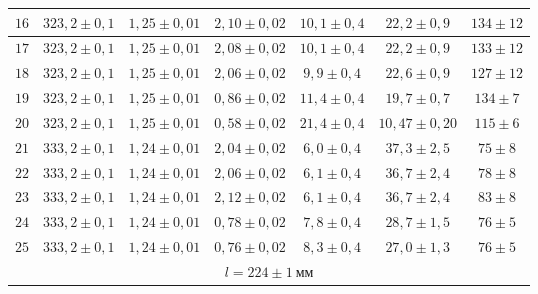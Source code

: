 \begin{tabular}{|c|c|c|c|c|c|c|}
  $16$ & $323,2 \pm 0,1$ & $1,25 \pm 0,01$ & $2,10 \pm 0,02$ & $10,1 \pm 0,4$ & $22,2 \pm 0,9$ & $134 \pm 12$\\ \hline
  $17$ & $323,2 \pm 0,1$ & $1,25 \pm 0,01$ & $2,08 \pm 0,02$ & $10,1 \pm 0,4$ & $22,2 \pm 0,9$ & $133 \pm 12$\\ \hline
  $18$ & $323,2 \pm 0,1$ & $1,25 \pm 0,01$ & $2,06 \pm 0,02$ & $9,9 \pm 0,4$ & $22,6 \pm 0,9$ & $127 \pm 12$\\ \hline
  $19$ & $323,2 \pm 0,1$ & $1,25 \pm 0,01$ & $0,86 \pm 0,02$ & $11,4 \pm 0,4$ & $19,7 \pm 0,7$ & $134 \pm 7$\\ \hline
  $20$ & $323,2 \pm 0,1$ & $1,25 \pm 0,01$ & $0,58 \pm 0,02$ & $21,4 \pm 0,4$ & $10,47 \pm 0,20$ & $115 \pm 6$\\ \hline

  $21$ & $333,2 \pm 0,1$ & $1,24 \pm 0,01$ & $2,04 \pm 0,02$ & $6,0 \pm 0,4$ & $37,3 \pm 2,5$ & $75 \pm 8$\\ \hline
  $22$ & $333,2 \pm 0,1$ & $1,24 \pm 0,01$ & $2,06 \pm 0,02$ & $6,1 \pm 0,4$ & $36,7 \pm 2,4$ & $78 \pm 8$\\ \hline
  $23$ & $333,2 \pm 0,1$ & $1,24 \pm 0,01$ & $2,12 \pm 0,02$ & $6,1 \pm 0,4$ & $36,7 \pm 2,4$ & $83 \pm 8$\\ \hline
  $24$ & $333,2 \pm 0,1$ & $1,24 \pm 0,01$ & $0,78 \pm 0,02$ & $7,8 \pm 0,4$ & $28,7 \pm 1,5$ & $76 \pm 5$\\ \hline
  $25$ & $333,2 \pm 0,1$ & $1,24 \pm 0,01$ & $0,76 \pm 0,02$ & $8,3 \pm 0,4$ & $27,0 \pm 1,3$ & $76 \pm 5$\\ \hline
  \multicolumn{7}{|c|}{$l = 224 \pm 1\ мм$} \\ \hline
\end{tabular}

